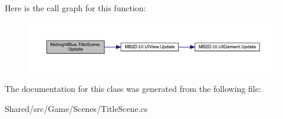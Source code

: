 Here is the call graph for this function\+:
\nopagebreak
\begin{figure}[H]
\begin{center}
\leavevmode
\includegraphics[width=350pt]{class_midnight_blue_1_1_title_scene_a4052b2a261434462cd0150e2f4da3c5b_cgraph}
\end{center}
\end{figure}


The documentation for this class was generated from the following file\+:\begin{DoxyCompactItemize}
\item 
Shared/src/\+Game/\+Scenes/Title\+Scene.\+cs\end{DoxyCompactItemize}
